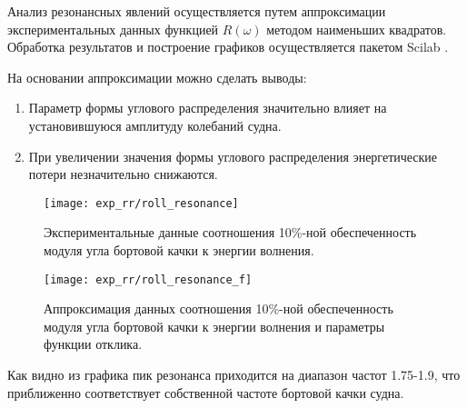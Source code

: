 Анализ резонансных явлений осуществляется путем аппроксимации экспериментальных данных функцией $R(\omega)$ методом наименьших квадратов. Обработка результатов и построение графиков осуществляется пакетом Scilab \citep{scilab}.


На основании аппроксимации можно сделать выводы:
\begin{enumerate}
	\item	Параметр формы углового распределения значительно влияет на установившуюся амплитуду колебаний судна.
	\item 	При увеличении значения формы углового распределения энергетические потери незначительно снижаются.
\end{enumerate}

\begin{sidewaysfigure}
	\texttt{[image: exp\_rr/roll\_resonance]}
	\caption{Экспериментальные данные соотношения 10\%-ной обеспеченность модуля угла бортовой качки к энергии волнения.}
	\label{rr:data}
\end{sidewaysfigure}

\begin{sidewaysfigure}
	\texttt{[image: exp\_rr/roll\_resonance\_f]}
	\caption{Аппроксимация данных соотношения 10\%-ной обеспеченность модуля угла бортовой качки к энергии волнения и параметры функции отклика.}
	\label{rr:dataf}
\end{sidewaysfigure}


Как видно из графика пик резонанса приходится на диапазон частот 1.75-1.9, что приближенно соответствует собственной частоте бортовой качки судна.